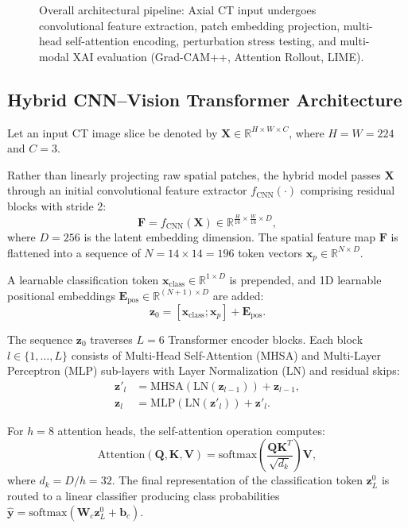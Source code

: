 \documentclass[journal]{IEEEtran}
\begin{document}
\begin{figure}[!t]
\centering
\fbox{\rule{0pt}{2.2in} \rule{0.92\linewidth}{0pt}}
\caption{Overall architectural pipeline: Axial CT input undergoes convolutional feature extraction, patch embedding projection, multi-head self-attention encoding, perturbation stress testing, and multi-modal XAI evaluation (Grad-CAM++, Attention Rollout, LIME).}
\label{fig:pipeline}
\end{figure}

\subsection{Hybrid CNN--Vision Transformer Architecture}
Let an input CT image slice be denoted by $\mathbf{X} \in \mathbb{R}^{H \times W \times C}$, where $H=W=224$ and $C=3$. 

Rather than linearly projecting raw spatial patches, the hybrid model passes $\mathbf{X}$ through an initial convolutional feature extractor $f_{\text{CNN}}(\cdot)$ comprising residual blocks with stride 2:
\begin{equation}
\mathbf{F} = f_{\text{CNN}}(\mathbf{X}) \in \mathbb{R}^{\frac{H}{16} \times \frac{W}{16} \times D},
\end{equation}
where $D = 256$ is the latent embedding dimension. The spatial feature map $\mathbf{F}$ is flattened into a sequence of $N = 14 \times 14 = 196$ token vectors $\mathbf{x}_p \in \mathbb{R}^{N \times D}$.

A learnable classification token $\mathbf{x}_{\text{class}} \in \mathbb{R}^{1 \times D}$ is prepended, and 1D learnable positional embeddings $\mathbf{E}_{\text{pos}} \in \mathbb{R}^{(N+1) \times D}$ are added:
\begin{equation}
\mathbf{z}_0 = [\mathbf{x}_{\text{class}}; \mathbf{x}_p] + \mathbf{E}_{\text{pos}}.
\end{equation}

The sequence $\mathbf{z}_0$ traverses $L = 6$ Transformer encoder blocks. Each block $l \in \{1, \dots, L\}$ consists of Multi-Head Self-Attention (MHSA) and Multi-Layer Perceptron (MLP) sub-layers with Layer Normalization ($\text{LN}$) and residual skips:
\begin{align}
\mathbf{z}'_l &= \text{MHSA}(\text{LN}(\mathbf{z}_{l-1})) + \mathbf{z}_{l-1}, \\
\mathbf{z}_l &= \text{MLP}(\text{LN}(\mathbf{z}'_l)) + \mathbf{z}'_l.
\end{align}

For $h = 8$ attention heads, the self-attention operation computes:
\begin{equation}
\text{Attention}(\mathbf{Q}, \mathbf{K}, \mathbf{V}) = \text{softmax}\left(\frac{\mathbf{Q}\mathbf{K}^T}{\sqrt{d_k}}\right)\mathbf{V},
\end{equation}
where $d_k = D / h = 32$. The final representation of the classification token $\mathbf{z}_L^0$ is routed to a linear classifier producing class probabilities $\hat{\mathbf{y}} = \text{softmax}(\mathbf{W}_c \mathbf{z}_L^0 + \mathbf{b}_c)$.
\end{document}
